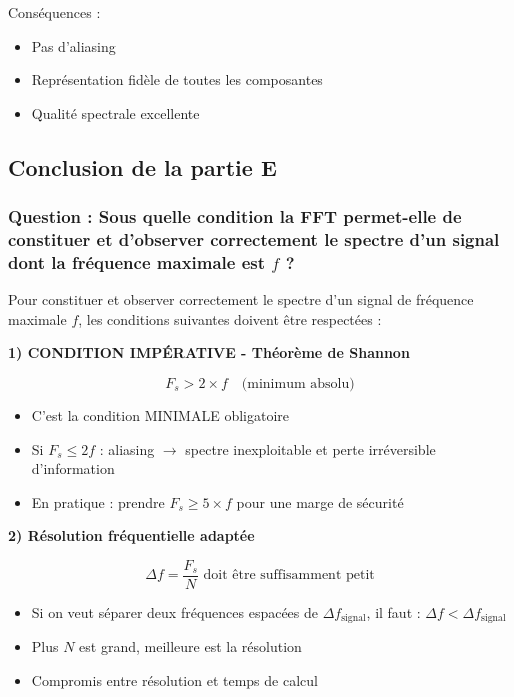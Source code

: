 \documentclass[12pt,a4paper]{article}
\begin{document}
Conséquences :
\begin{itemize}
    \item Pas d'aliasing
    \item Représentation fidèle de toutes les composantes
    \item Qualité spectrale excellente
\end{itemize}

\subsection{Conclusion de la partie E}

\subsubsection{Question : Sous quelle condition la FFT permet-elle de constituer et d'observer correctement le spectre d'un signal dont la fréquence maximale est $f$ ?}

Pour constituer et observer correctement le spectre d'un signal de fréquence maximale $f$, les conditions suivantes doivent être respectées :

\textbf{1) CONDITION IMPÉRATIVE - Théorème de Shannon}

\begin{equation}
    \boxed{F_s > 2 \times f \quad \text{(minimum absolu)}}
\end{equation}

\begin{itemize}
    \item C'est la condition MINIMALE obligatoire
    \item Si $F_s \leq 2f$ : aliasing $\rightarrow$ spectre inexploitable et perte irréversible d'information
    \item En pratique : prendre $\boxed{F_s \geq 5 \times f}$ pour une marge de sécurité
\end{itemize}

\textbf{2) Résolution fréquentielle adaptée}

\begin{equation}
    \Delta f = \frac{F_s}{N} \text{ doit être suffisamment petit}
\end{equation}

\begin{itemize}
    \item Si on veut séparer deux fréquences espacées de $\Delta f_{\text{signal}}$, il faut : $\Delta f < \Delta f_{\text{signal}}$
    \item Plus $N$ est grand, meilleure est la résolution
    \item Compromis entre résolution et temps de calcul
\end{itemize}
\end{document}
